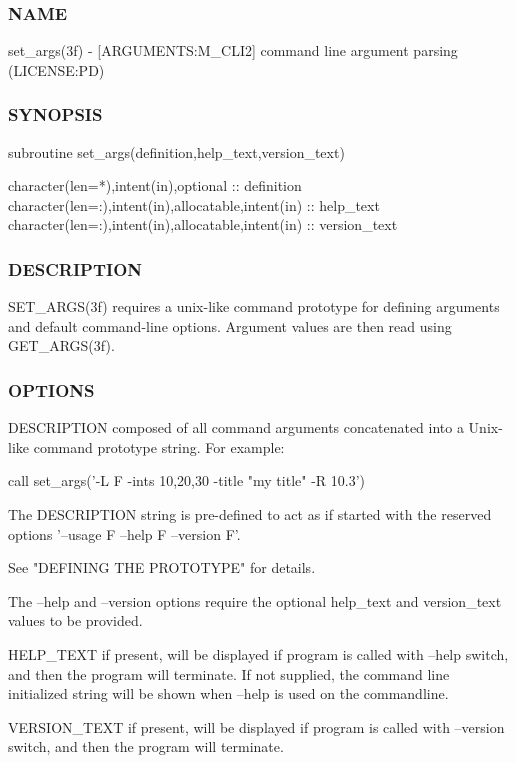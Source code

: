 \subsubsection*{N\+A\+ME}

set\+\_\+args(3f) -\/ \mbox{[}A\+R\+G\+U\+M\+E\+N\+TS\+:M\+\_\+\+C\+L\+I2\mbox{]} command line argument parsing (L\+I\+C\+E\+N\+SE\+:PD) 

\subsubsection*{S\+Y\+N\+O\+P\+S\+IS}

\begin{DoxyVerb} subroutine set_args(definition,help_text,version_text)

  character(len=*),intent(in),optional  :: definition
  character(len=:),intent(in),allocatable,intent(in) :: help_text
  character(len=:),intent(in),allocatable,intent(in) :: version_text
\end{DoxyVerb}
 \subsubsection*{D\+E\+S\+C\+R\+I\+P\+T\+I\+ON}

\begin{DoxyVerb} SET_ARGS(3f) requires a unix-like command prototype for defining
 arguments and default command-line options. Argument values are then
 read using GET_ARGS(3f).
\end{DoxyVerb}


\subsubsection*{O\+P\+T\+I\+O\+NS}

\begin{DoxyVerb}  DESCRIPTION   composed of all command arguments concatenated
                into a Unix-like command prototype string. For
                example:

                  call set_args('-L F -ints 10,20,30 -title "my title" -R 10.3')

                The DESCRIPTION string is pre-defined to act as if
                started with the reserved options '--usage F --help
                F --version F'.

                See "DEFINING THE PROTOTYPE" for details.


                The --help and --version options require the optional
                help_text and version_text values to be provided.

  HELP_TEXT     if present, will be displayed if program is called with
                --help switch, and then the program will terminate. If
                not supplied, the command line initialized string will be
                shown when --help is used on the commandline.

  VERSION_TEXT  if present, will be displayed if program is called with
                --version switch, and then the program will terminate.
\end{DoxyVerb}


